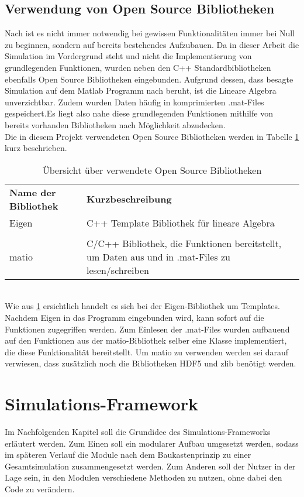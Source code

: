 \section{Verwendung von Open Source Bibliotheken}
\label{sec:OSBib}
Nach  \cite{Kessler.Wintersemester201718}  ist es nicht immer notwendig bei gewissen Funktionalitäten immer bei Null zu beginnen, sondern auf bereits bestehendes Aufzubauen.
Da in dieser Arbeit die Simulation im Vordergrund steht und nicht die Implementierung von grundlegenden Funktionen, wurden neben den C++ Standardbibliotheken ebenfalls Open Source Bibliotheken eingebunden. Aufgrund dessen, dass besagte Simulation auf dem Matlab Programm nach \cite{Olucak.15.02.2017} beruht, ist die Lineare Algebra unverzichtbar. Zudem wurden Daten häufig in komprimierten .mat-Files gespeichert.\newpage Es liegt also nahe diese grundlegenden Funktionen mithilfe von bereits vorhanden Bibliotheken nach Möglichkeit abzudecken.
\\Die in diesem Projekt verwendeten Open Source Bibliotheken werden in Tabelle \ref{tab:openSource} kurz beschrieben.
\begin{table}[h]
	\centering	\begin{tabular}{l p{10cm}}
		\textbf{Name der Bibliothek} & \textbf{Kurzbeschreibung}\\
		Eigen &  C++ Template Bibliothek für lineare Algebra \cite{TuxFamily.2018}\\\\
		matio & C/C++ Bibliothek, die Funktionen bereitstellt, um Daten aus und in .mat-Files zu lesen/schreiben
	\end{tabular}
	\caption{Übersicht über verwendete Open Source Bibliotheken}
	\label{tab:openSource}
\end{table}\\
Wie aus \ref{tab:openSource} ersichtlich handelt es sich bei der Eigen-Bibliothek um Templates. Nachdem Eigen in das Programm eingebunden wird, kann sofort auf die Funktionen zugegriffen werden. Zum Einlesen der .mat-Files wurden aufbauend auf den  Funktionen aus der matio-Bibliothek selber eine Klasse implementiert, die diese Funktionalität bereitstellt. Um matio zu verwenden werden sei darauf verwiesen, dass zusätzlich noch die Bibliotheken HDF5 und zlib benötigt werden. 



\chapter{Simulations-Framework}
\label{ch:Simulations-Framework}
Im Nachfolgenden Kapitel soll die Grundidee des Simulations-Frameworks erläutert werden. Zum Einen soll ein modularer Aufbau umgesetzt werden, sodass im späteren Verlauf die Module nach dem Baukastenprinzip zu einer Gesamtsimulation zusammengesetzt werden. Zum Anderen soll der Nutzer in der Lage sein, in den Modulen verschiedene Methoden zu nutzen, ohne dabei den Code zu verändern.
